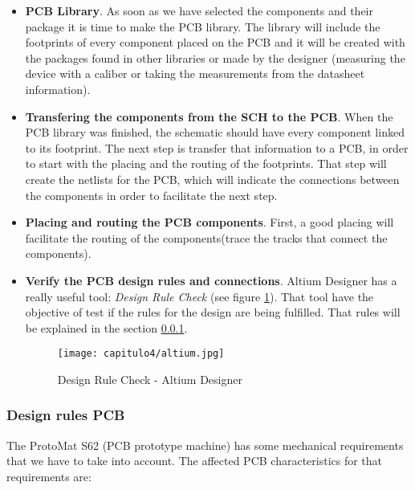 \begin{itemize}
\item \textbf{\acrshort{PCB} Library}. As soon as we have selected the components and their package it is time to make the PCB library. The library will include the footprints of every component placed on the \acrshort{PCB} and it will be created with the packages found in other libraries or made by the designer (measuring the device with a caliber or taking the measurements from the datasheet information).


\item \textbf{Transfering the components from the \acrshort{SCH} to the \acrshort{PCB}}. When the \acrshort{PCB} library was finished, the schematic should have every component linked to its footprint. The next step is transfer that information to a PCB, in order to start with the placing and the routing of the footprints. That step will create the netlists for the PCB, which will indicate the connections between the components in order to facilitate the next step.

\item \textbf{Placing and routing the \acrshort{PCB} components}. First, a good placing will facilitate the routing of the components(trace the tracks that connect the components). 

\item \textbf{Verify the \acrshort{PCB} design rules and connections}. Altium Designer has a really useful tool: \textit{Design Rule Check} (see figure \ref{fig:altium}). That tool have the objective of test if the rules for the design are being fulfilled. That rules will be explained in the section \ref{sssec:rulesaltium}.

\begin{figure}[H]
	\centering
		\texttt{[image: capitulo4/altium.jpg]}
	\caption{Design Rule Check -  Altium Designer}
	\label{fig:altium}
\end{figure}

\end{itemize}


\subsubsection{Design rules \acrshort{PCB}} \label{sssec:rulesaltium}

The ProtoMat S62 (PCB prototype machine) has some mechanical requirements that we have to take into account. The affected \acrshort{PCB} characteristics for that requirements are:

